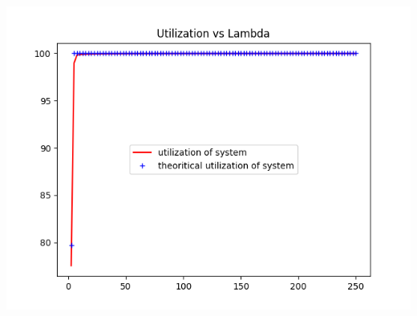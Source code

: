 \documentclass[11pt]{article}
\begin{document}
 \includegraphics{Utilization_L100_K75_M25_U10}
 
\end{document}
